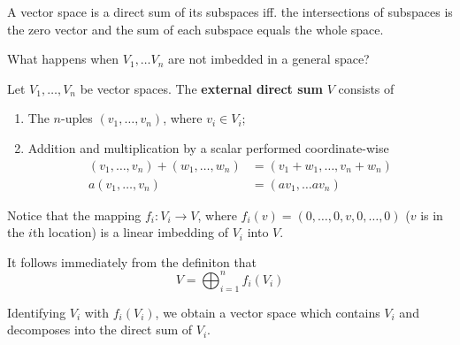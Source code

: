 A vector space is a direct sum of its subspaces iff. the intersections of subspaces is the zero vector and the sum of each subspace equals the whole space.

What happens when $V_1, \ldots V_n$ are not imbedded in a general space? 

\begin{definition}
	Let $V_1, \ldots, V_n$ be vector spaces. The \textbf{external direct sum} $V$ consists of 
	\begin{enumerate}
		\item The $n$-uples $(v_1, \ldots, v_n)$, where $v_i \in V_i$;
		\item Addition and multiplication by a scalar performed coordinate-wise 
		\begin{equation*}
			\begin{aligned}
				(v_1, \ldots, v_n) + (w_1, \ldots, w_n) &= (v_1 + w_1, \ldots, v_n + w_n) \\
				a (v_1, \ldots, v_n) &= (av_1, \ldots av_n)
			\end{aligned}
		\end{equation*}
	\end{enumerate}
\end{definition}

Notice that the mapping $f_i : V_i \longrightarrow V$, where $f_i(v) = (0, \ldots, 0, v, 0, \ldots, 0)$ ($v$ is in the $i$th location) is a linear imbedding of $V_i$ into $V$.

It follows immediately from the definiton that
\[
	V = \bigoplus_{i=1}^n f_i(V_i)
\]

Identifying $V_i$ with $f_i(V_i)$, we obtain a vector space which contains $V_i$ and decomposes into the direct sum of $V_i$.